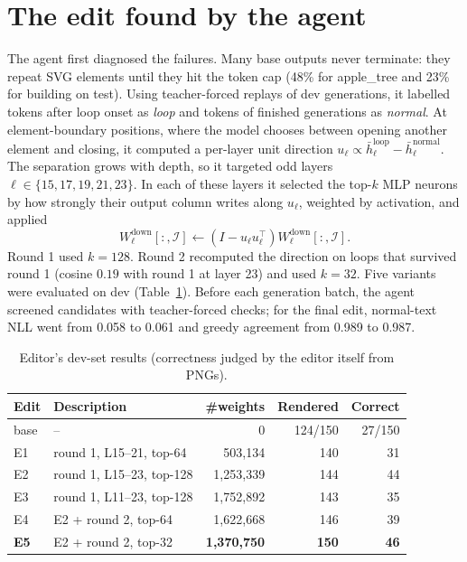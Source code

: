 \documentclass[11pt]{article}
\begin{document}
\section{The edit found by the agent}
The agent first diagnosed the failures. Many base outputs never terminate: they repeat SVG elements until they hit the token cap (48\% for apple\_tree and 23\% for building on test). Using teacher-forced replays of dev generations, it labelled tokens after loop onset as \emph{loop} and tokens of finished generations as \emph{normal}.
At element-boundary positions, where the model chooses between opening another element and closing, it computed a per-layer unit direction $u_\ell \propto \bar h^{\text{loop}}_\ell-\bar h^{\text{normal}}_\ell$. The separation grows with depth, so it targeted odd layers $\ell\in\{15,17,19,21,23\}$.
In each of these layers it selected the top-$k$ MLP neurons by how strongly their output column writes along $u_\ell$, weighted by activation, and applied
\begin{equation}
W^{\text{down}}_{\ell}[:,\mathcal I]\leftarrow \left(I-u_\ell u_\ell^\top\right)W^{\text{down}}_{\ell}[:,\mathcal I].
\end{equation}
Round 1 used $k=128$. Round 2 recomputed the direction on loops that survived round 1 (cosine $0.19$ with round 1 at layer 23) and used $k=32$.
Five variants were evaluated on dev (Table~\ref{tab:dev}). Before each generation batch, the agent screened candidates with teacher-forced checks; for the final edit, normal-text NLL went from 0.058 to 0.061 and greedy agreement from 0.989 to 0.987.
\begin{table}[h]\centering\small
\begin{tabular}{llrrr}\toprule
Edit & Description & \#weights & Rendered & Correct\\\midrule
base & -- & 0 & 124/150 & 27/150\\
E1 & round 1, L15--21, top-64 & 503{,}134 & 140 & 31\\
E2 & round 1, L15--23, top-128 & 1{,}253{,}339 & 144 & 44\\
E3 & round 1, L11--23, top-128 & 1{,}752{,}892 & 143 & 35\\
E4 & E2 + round 2, top-64 & 1{,}622{,}668 & 146 & 39\\
\textbf{E5} & E2 + round 2, top-32 & \textbf{1{,}370{,}750} & \textbf{150} & \textbf{46}\\\bottomrule
\end{tabular}\caption{Editor's dev-set results (correctness judged by the editor itself from PNGs).}\label{tab:dev}\end{table}
\end{document}
